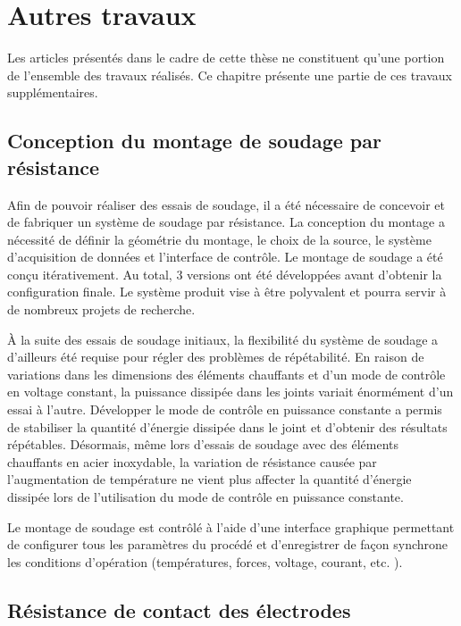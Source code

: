 \label{sec:Discussion}

\section{Autres travaux}

Les articles présentés dans le cadre de cette thèse ne constituent qu'une portion de l'ensemble des travaux réalisés. 
Ce chapitre présente une partie de ces travaux supplémentaires. 

\subsection{Conception du montage de soudage par résistance}

Afin de pouvoir réaliser des essais de soudage, il a été nécessaire de concevoir et de fabriquer un système de soudage par résistance. 
La conception du montage a nécessité de définir la géométrie du montage, le choix de la source, le système d'acquisition de données et l'interface de contrôle. 
Le montage de soudage a été conçu itérativement.
Au total, 3 versions ont été développées avant d'obtenir la configuration finale. 
Le système produit vise à être polyvalent et pourra servir à de nombreux projets de recherche. 

À la suite des essais de soudage initiaux, la flexibilité du système de soudage a d'ailleurs été requise pour régler des problèmes de répétabilité. 
En raison de variations dans les dimensions des éléments chauffants et d'un mode de contrôle en voltage constant, la puissance dissipée dans les joints variait énormément d'un essai à l'autre. 
Développer le mode de contrôle en puissance constante a permis de stabiliser la quantité d'énergie dissipée dans le joint et d'obtenir des résultats répétables. 
Désormais, même lors d'essais de soudage avec des éléments chauffants en acier inoxydable, la variation de résistance causée par l'augmentation de température ne vient plus affecter la quantité d'énergie dissipée lors de l'utilisation du mode de contrôle en puissance constante. 

Le montage de soudage est contrôlé à l'aide d'une interface graphique permettant de configurer tous les paramètres du procédé et d'enregistrer de façon synchrone les conditions d'opération (températures, forces, voltage, courant, etc. ). 

\FloatBarrier
\subsection{Résistance de contact des électrodes}

